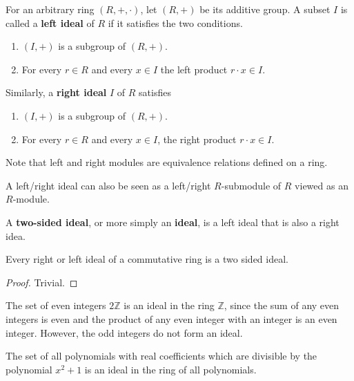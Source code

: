    \begin{definition}
      For an arbitrary ring $(R,+, \cdot)$, let $(R, +)$ be its additive group. A subset $I$ is called a \textbf{left ideal} of $R$ if it satisfies the two conditions. 
      \begin{enumerate}
        \item $(I, +)$ is a subgroup of $(R, +)$. 
        \item For every $r \in R$ and every $x \in I$ the left product $r \cdot x \in I$. 
      \end{enumerate}
      Similarly, a \textbf{right ideal} $I$ of $R$ satisfies
      \begin{enumerate}
        \item $(I, +)$ is a subgroup of $(R, +)$. 
        \item For every $r \in R$ and every $x \in I$, the right product $r \cdot x \in I$. 
      \end{enumerate}
      Note that left and right modules are equivalence relations defined on a ring. 
    \end{definition}

    A left/right ideal can also be seen as a left/right $R$-submodule of $R$ viewed as an $R$-module. 

    \begin{definition}
      A \textbf{two-sided ideal}, or more simply an \textbf{ideal}, is a left ideal that is also a right idea. 
    \end{definition}

    \begin{proposition}
      Every right or left ideal of a commutative ring is a two sided ideal. 
    \end{proposition}
    \begin{proof}
      Trivial. 
    \end{proof}

    \begin{example}
      The set of even integers $2 \mathbb{Z}$ is an ideal in the ring $\mathbb{Z}$, since the sum of any even integers is even and the product of any even integer with an integer is an even integer. However, the odd integers do not form an ideal. 
    \end{example}

    \begin{example}
      The set of all polynomials with real coefficients which are divisible by the polynomial $x^2 + 1$ is an ideal in the ring of all polynomials. 
    \end{example}

